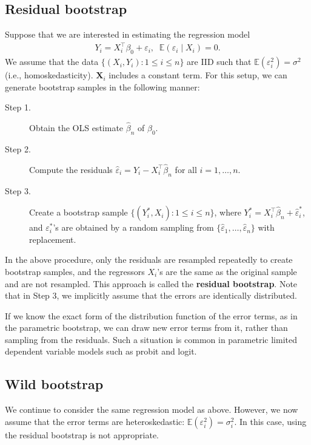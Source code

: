 \documentclass[10.5pt, A4paper, openany, uplatex]{book}
\newcommand{\mbf}{\mathbf}
\newcommand{\eps}{\varepsilon}
\newcommand{\E}{\mathbb{E}}
\renewcommand{\hat}{\widehat}
\numberwithin{equation}{section}
\begin{document}
\subsection{Residual bootstrap}

Suppose that we are interested in estimating the regression model
\begin{align*}
	Y_i = X_i^\top \beta_0 + \eps_i, \;\; \E(\eps_i \mid X_i) = 0.
\end{align*}
We assume that the data $\{(X_i, Y_i) : 1 \le i \le n\}$ are IID such that $\E(\eps_i^2) = \sigma^2$ (i.e., homoskedasticity).
$\mbf{X}_i$ includes a constant term.
For this setup, we can generate bootstrap samples in the following manner:
\begin{description}
	\item[Step 1.] Obtain the OLS estimate $\hat \beta_n$ of $\beta_0$.
	\item[Step 2.] Compute the residuals $\hat \eps_i = Y_i - X_i^\top \hat \beta_n$ for all $i= 1, \ldots, n$.
	\item[Step 3.] Create a bootstrap sample $\{(Y_i^*, X_i): 1 \le i \le n\}$, where $Y_i^* = X_i^\top \hat \beta_n + \hat \eps_i^*$, and $\eps^*_i$'s are obtained by a random sampling from $\{\hat \eps_1, \ldots, \hat \eps_n\}$ with replacement.
\end{description}
In the above procedure, only the residuals are resampled repeatedly to create bootstrap samples, and the regressors $X_i$'s are the same as the original sample and are not resampled.
This approach is called the \textbf{residual bootstrap}.
Note that in Step 3, we implicitly assume that the errors are identically distributed.

If we know the exact form of the distribution function of the error terms, as in the parametric bootstrap, we can draw new error terms from it, rather than sampling from the residuals.
Such a situation is common in parametric limited dependent variable models such as probit and logit.

\subsection{Wild bootstrap}

We continue to consider the same regression model as above.
However, we now assume that the error terms are heteroskedastic: $\E(\eps_i^2) = \sigma_i^2$.
In this case, using the residual bootstrap is not appropriate.
\end{document}
